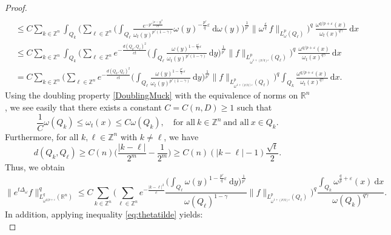 \documentclass[12pt, letterpaper]{amsart}
\theoremstyle{definition}
\theoremstyle{remark}
\numberwithin{equation}{section}
\begin{document}
\begin{proof}
\begin{align*}
        \\& \leq C \sum_{k\in \mathbb{Z}^n} \int_{Q_{k}} \bigg( \sum_{\ell\in \mathbb{Z}^n} \bigg( \int_{Q_{\ell}} \frac{e^{-p'\frac{|x-y|^2}{ct}}}{\omega_t(y)^{p'(1-\gamma)}} \omega(y)^{-\frac{p'}{q}\varepsilon} \ \mathrm{d} \omega(y) \bigg)^{\frac{1}{p'}} \|\omega^{\frac{\varepsilon}{q}}  \, f \|_{L^p_\omega(Q_{\ell})} \bigg)^q \ \frac{\omega^{q/p+\varepsilon}(x)}{\omega_t(x)^{q \gamma}} \ \mathrm{d}x
        \\& \leq C \sum_{k\in \mathbb{Z}^n} \int_{Q_{k}} \bigg( \sum_{\ell \in \mathbb{Z}^n} e^{-\frac{d(Q_{k},Q_{\ell})^2}{ct}} \bigg( \int_{Q_{\ell}} \frac{\omega(y)^{1-\frac{p'}{q}\varepsilon}}{\omega_t(y)^{p'(1-\gamma)}} \ \mathrm{d} y \bigg )^{\frac{1}{p'}} \| f \|_{L^p_{\omega^{1+(p/q)\varepsilon}}(Q_{\ell})} \bigg)^q \ \frac{\omega^{q/p+\varepsilon}(x)}{\omega_t(x)^{q \gamma}} \ \mathrm{d}x 
        \\& = C \sum_{k\in \mathbb{Z}^n}  \bigg( \sum_{\ell \in \mathbb{Z}^n} e^{-\frac{d(Q_{k},Q_{\ell})^2}{ct}} \bigg( \int_{Q_{\ell}} \frac{\omega(y)^{1-\frac{p'}{q}\varepsilon}}{\omega_t(y)^{p'(1-\gamma)}} \ \mathrm{d} y \bigg)^{\frac{1}{p'}} \| f \|_{L^p_{\omega^{1+(p/q)\varepsilon}}(Q_{\ell})} \bigg)^q \int_{Q_{k}} \frac{\omega^{q/p+\varepsilon}(x)}{\omega_t(x)^{q \gamma}} \ \mathrm{d}x.
    \end{align*}
    Using the doubling property \eqref{DoublingMuck} with the equivalence of norms on $\mathbb{R}^n$, we see easily that there exists a constant $C=C(n,D)\ge 1 $ such that 
    $$ \frac{1}{C} \omega(Q_{k}) \leq \omega_t(x) \leq C \omega(Q_{k}), \quad \text{for all} \ k\in \mathbb{Z}^n \ \text{and all} \ x \in Q_{k}.$$
    Furthermore, for all $k,\ell \in \mathbb{Z}^n$ with $k \neq \ell$, we have
    $$d(Q_{k},Q_{\ell}) \ge C(n) \bigg(\frac{|k-\ell|}{2^m}-\frac{1}{2^m}\bigg) \ge C(n)(|k-\ell|-1)\frac{\sqrt{t}}{2}.$$
    Thus, we obtain 
    \begin{equation}\label{eq:smgroupe}
        \| e^{t\Delta_\omega} f \|^q_{L^q_{{\omega}^{q/p+\varepsilon}}(\mathbb{R}^n)} \leq C \sum_{k\in \mathbb{Z}^n}  \bigg( \sum_{\ell\in \mathbb{Z}^n} e^{-\frac{|k-\ell|^2}{c}} \frac{\big( \int_{Q_{\ell}} \omega(y)^{1-\frac{p'}{q}\varepsilon}\ \mathrm{d} y \big)^{\frac{1}{p'}}}{\omega(Q_\ell)^{1-\gamma}}  \| f \|_{L^p_{\omega^{1+(p/q)\varepsilon}}(Q_{\ell})} \bigg)^q \frac{\int_{Q_{k}} \omega^{\frac{q}{p}+\varepsilon}(x) \ \mathrm{d}x}{\omega(Q_k)^{q\gamma}}.
    \end{equation}
    In addition, applying inequality \eqref{eq:thetatilde} yields: 
    \begin{equation}\label{eq:1}

\end{equation}
\end{proof}
\end{document}
